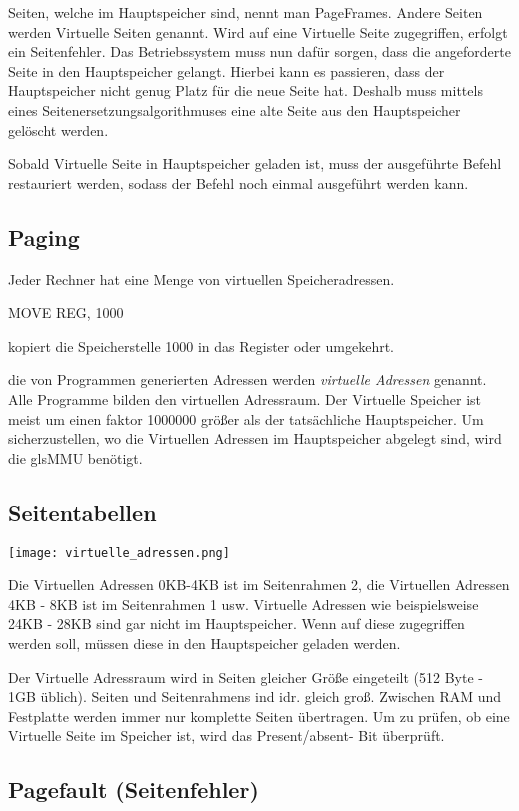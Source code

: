 Seiten, welche im Hauptspeicher sind, nennt man PageFrames. Andere Seiten
werden Virtuelle Seiten genannt. Wird auf eine Virtuelle Seite zugegriffen,
erfolgt ein Seitenfehler. Das Betriebssystem muss nun dafür sorgen, dass die
angeforderte Seite in den Hauptspeicher gelangt. Hierbei kann es passieren,
dass der Hauptspeicher nicht genug Platz für die neue Seite hat. Deshalb muss
mittels eines Seitenersetzungsalgorithmuses eine alte Seite aus den
Hauptspeicher gelöscht werden.

Sobald Virtuelle Seite in Hauptspeicher geladen ist, muss der ausgeführte
Befehl restauriert werden, sodass der Befehl noch einmal ausgeführt werden
kann.

\subsection{Paging}

Jeder Rechner hat eine Menge von virtuellen Speicheradressen.

MOVE REG, 1000

kopiert die Speicherstelle 1000 in das Register oder umgekehrt.

die von Programmen generierten Adressen werden \textit{virtuelle Adressen}
genannt. Alle Programme bilden den virtuellen Adressraum. Der Virtuelle
Speicher ist meist um einen faktor 1000000 größer als der tatsächliche
Hauptspeicher. Um sicherzustellen, wo die Virtuellen Adressen im Hauptspeicher
abgelegt sind, wird die gls{MMU} benötigt.

\subsection{Seitentabellen}

\texttt{[image: virtuelle\_adressen.png]}

Die Virtuellen Adressen 0KB-4KB ist im Seitenrahmen 2, die Virtuellen Adressen
4KB - 8KB ist im Seitenrahmen 1 usw. Virtuelle Adressen wie beispielsweise 24KB
- 28KB sind gar nicht im Hauptspeicher. Wenn auf diese zugegriffen werden soll,
müssen diese in den Hauptspeicher geladen werden.

Der Virtuelle Adressraum wird in Seiten gleicher Größe eingeteilt (512 Byte -
1GB üblich). Seiten und Seitenrahmens ind idr. gleich groß. Zwischen RAM und
Festplatte werden immer nur komplette Seiten übertragen. Um zu prüfen, ob eine
Virtuelle Seite im Speicher ist, wird das Present/absent- Bit überprüft.

\subsection{Pagefault (Seitenfehler)}

